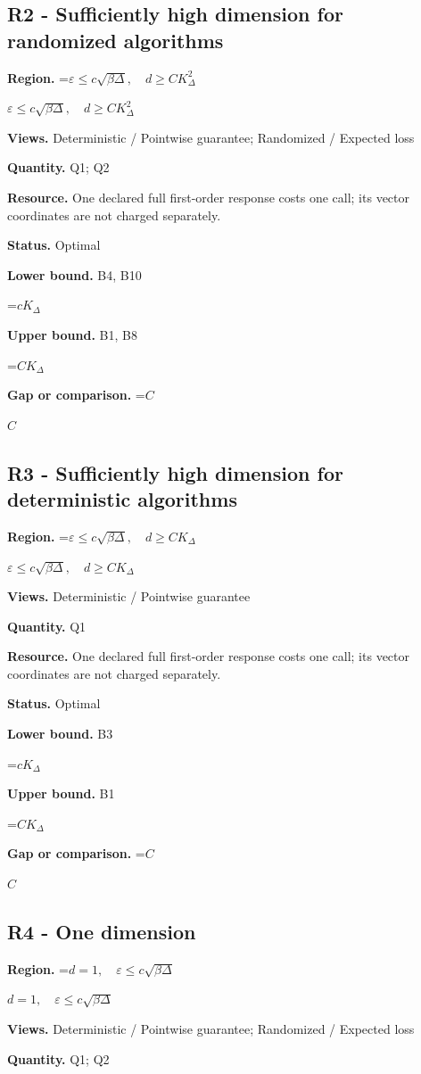 \documentclass[10pt,a4paper]{article}
\newcommand{\AtlasMath}[1]{\par\begingroup\centering\setbox0=\hbox{$\displaystyle #1$}\ifdim\wd0>1.4\linewidth\typeout{ATLAS WIDE FORMULA: \the\wd0}\fi\ifdim\wd0>\linewidth\resizebox{\linewidth}{!}{\box0}\else\box0\fi\par\endgroup}
\newcommand{\AtlasInlineMath}[1]{\begingroup\setbox0=\hbox{$#1$}\ifdim\wd0>.4\linewidth\endgroup\AtlasMath{#1}\else\endgroup$#1$\fi}
\begin{document}
\subsection{R2 - Sufficiently high dimension for randomized algorithms}
\textbf{Region.} \AtlasInlineMath{\varepsilon\le c\sqrt{\beta\Delta},\quad d\ge CK_\Delta^2}

\textbf{Views.} Deterministic / Pointwise guarantee; Randomized / Expected loss

\textbf{Quantity.} Q1; Q2

\textbf{Resource.} One declared full first-order response costs one call; its vector coordinates are not charged separately.

\textbf{Status.} Optimal

\textbf{Lower bound.} B4, B10

\AtlasMath{cK_\Delta}
\textbf{Upper bound.} B1, B8

\AtlasMath{CK_\Delta}
\textbf{Gap or comparison.} \AtlasInlineMath{C}

\subsection{R3 - Sufficiently high dimension for deterministic algorithms}
\textbf{Region.} \AtlasInlineMath{\varepsilon\le c\sqrt{\beta\Delta},\quad d\ge CK_\Delta}

\textbf{Views.} Deterministic / Pointwise guarantee

\textbf{Quantity.} Q1

\textbf{Resource.} One declared full first-order response costs one call; its vector coordinates are not charged separately.

\textbf{Status.} Optimal

\textbf{Lower bound.} B3

\AtlasMath{cK_\Delta}
\textbf{Upper bound.} B1

\AtlasMath{CK_\Delta}
\textbf{Gap or comparison.} \AtlasInlineMath{C}

\subsection{R4 - One dimension}
\textbf{Region.} \AtlasInlineMath{d=1,\quad\varepsilon\le c\sqrt{\beta\Delta}}

\textbf{Views.} Deterministic / Pointwise guarantee; Randomized / Expected loss

\textbf{Quantity.} Q1; Q2
\end{document}
